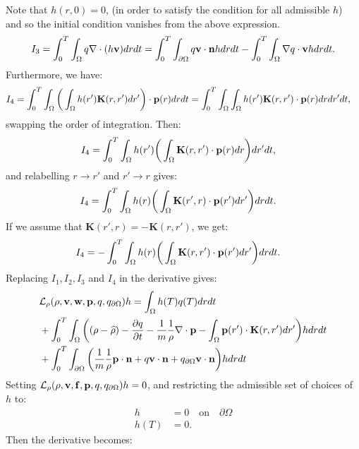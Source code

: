 Note that ${h}(r,0)=0$, (in order to satisfy the condition for all admissible ${h}$) and so the initial condition vanishes from the above expression.
\begin{align*}
I_3= \int_0^T \int_\Omega q\nabla \cdot (h \mathbf{v}) dr dt = \int_0^T \int_{\partial \Omega} q \mathbf{v} \cdot \mathbf{n} h dr dt - \int_0^T \int_\Omega \nabla q \cdot \mathbf{v} h dr dt.
\end{align*}
Furthermore, we have:
\begin{align*}
I_{4}&= \int_0^T \int_\Omega \bigg(\int_\Omega  h(r') \mathbf{K}(r,r')dr'\bigg) \cdot \mathbf{p}(r) drdt=\int_0^T \int_\Omega \int_\Omega h(r') \mathbf{K}(r,r') \cdot \mathbf{p}(r) drdr'dt,
\end{align*}
swapping the order of integration. Then:
\begin{align*}
I_{4}&= \int_0^T \int_\Omega  h(r')\bigg(\int_\Omega  \mathbf{K}(r,r')\cdot \mathbf{p}(r) dr \bigg)dr'dt,
\end{align*}
and relabelling $r \to r'$ and $r' \to r$ gives:
\begin{align*}
I_{4}&= \int_0^T \int_\Omega  h(r)\bigg(\int_\Omega  \mathbf{K}(r',r) \cdot \mathbf{p}(r') dr' \bigg)drdt.
\end{align*}
If we assume that $\mathbf{K}(r',r) = - \mathbf{K}(r,r')$, we get:
\begin{align*}
I_{4}&= -\int_0^T \int_\Omega  h(r)\bigg(\int_\Omega  \mathbf{K}(r,r') \cdot \mathbf{p}(r') dr' \bigg)drdt.
\end{align*}
Replacing $I_1, I_2, I_3$ and $I_4$ in the derivative gives:
\begin{align*}
&\mathcal{L}_\rho(\rho,\mathbf{v},\mathbf{w},\mathbf{p},q,{q}_{\partial \Omega})h = \int_\Omega h(T) q(T) dr dt  \\
&+ \int_0^T \int_\Omega \bigg( (\rho - \widehat {\rho}) - \frac{\partial q}{\partial t} -\frac{1}{m} \frac{1}{\rho}\nabla \cdot \mathbf{p} -  \int_\Omega  \mathbf{p}(r') \cdot\mathbf{K}(r,r')   dr'  \bigg)hdr dt\\
&+\int_0^T \int_{\partial \Omega} \bigg( \frac{1}{m} \frac{1}{\rho} \mathbf{p} \cdot \mathbf{n} + q \mathbf{v} \cdot \mathbf{n}   +{q}_{\partial \Omega} \mathbf{v} \cdot \mathbf{n}\bigg)h  dr dt
\end{align*}
Setting $\mathcal{L}_\rho(\rho,\mathbf{v},\mathbf{f},\mathbf{p},q,{q}_{\partial \Omega})h=0$, and restricting the admissible set of choices of $h$ to:
\begin{align*}
h&=0 \quad \text{on} \quad \partial \Omega\\
h(T)&=0.
\end{align*}
Then the derivative becomes:
